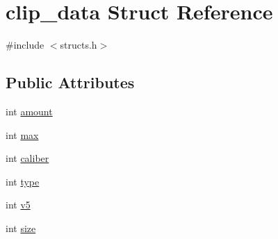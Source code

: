 \hypertarget{structclip__data}{\section{clip\-\_\-data Struct Reference}
\label{structclip__data}
}


{\ttfamily \#include $<$structs.\-h$>$}

\subsection*{Public Attributes}
\begin{DoxyCompactItemize}
\item 
int \hyperlink{structclip__data_a293644cd04761437ea5219aaad96b323}{amount}
\item 
int \hyperlink{structclip__data_a3f7387b26f105100bf16668b1e6d087d}{max}
\item 
int \hyperlink{structclip__data_a2a4daf8e05d84ea4fffb8b805e32838e}{caliber}
\item 
int \hyperlink{structclip__data_a04ac29308b00699c96f6b652e45d4e2e}{type}
\item 
int \hyperlink{structclip__data_a667e11ffc4de60b5dc2fd80d501485a5}{v5}
\item 
int \hyperlink{structclip__data_a6cd1820a754972b4415591114fd2f94b}{size}
\end{DoxyCompactItemize}


